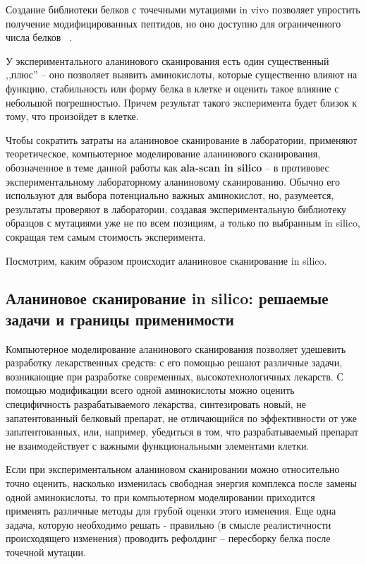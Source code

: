 Создание библиотеки белков с точечными мутациями in vivo позволяет упростить получение модифицированных пептидов, но оно доступно для ограниченного числа белков ~\cite{alascan2001}.

У экспериментального аланинового  сканирования есть один существенный ,,плюс'' -- оно позволяет выявить  аминокислоты, которые существенно влияют на функцию, стабильность или форму белка в клетке и оценить такое влияние с небольшой погрешностью. Причем результат такого эксперимента будет близок к тому, что произойдет в клетке. 

Чтобы сократить затраты на аланиновое сканирование в лаборатории, применяют теоретическое, компьютерное моделирование аланинового сканирования, обозначенное в теме данной работы как \textbf{ala-scan in silico} -- в противовес экспериментальному лабораторному аланиновому сканированию. Обычно его используют для выбора потенциально важных аминокислот, но, разумеется, результаты проверяют в лаборатории, создавая экспериментальную библиотеку образцов с мутациями уже не по всем позициям, а только по выбранным in silico, сокращая тем самым стоимость эксперимента.

Посмотрим, каким образом происходит аланиновое сканирование in silico.
\subsection{Аланиновое сканирование in silico: решаемые задачи и границы применимости}

Компьютерное моделирование аланинового сканирования позволяет удешевить разработку лекарственных средств: с его помощью решают различные задачи, возникающие при разработке современных, высокотехнологичных лекарств. С помощью модификации всего одной аминокислоты можно оценить специфичность разрабатываемого лекарства, синтезировать новый, не запатентованный белковый препарат, не отличающийся по эффективности от уже запатентованных, или, например, убедиться в том, что разрабатываемый препарат не взаимодействует с важными функциональными элементами клетки. 


Если при экспериментальном аланиновом сканировании можно относительно точно оценить, насколько изменилась свободная энергия комплекса после замены одной аминокислоты, то при компьютерном моделировании приходится применять различные методы для грубой оценки этого изменения. Еще одна задача, которую необходимо решать - правильно (в смысле реалистичности происходящего изменения) проводить рефолдинг -- пересборку белка после точечной мутации.

